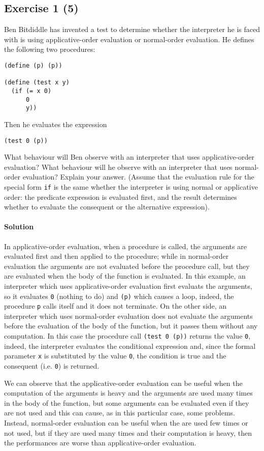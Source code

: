 \subsection*{Exercise 1 (5)}
Ben Bitdiddle has invented a test to determine whether the interpreter he is faced with is using applicative-order evaluation 
or normal-order evaluation. He defines the following two procedures:

\begin{lstlisting}
(define (p) (p))

(define (test x y)
  (if (= x 0)
      0
      y))
\end{lstlisting}

Then he evaluates the expression

\begin{lstlisting}
(test 0 (p))
\end{lstlisting}

What behaviour will Ben observe with an interpreter that uses applicative-order evaluation? What behaviour will he
observe with an interpreter that uses normal-order evaluation? Explain your answer. (Assume that the evaluation
rule for the special form \texttt{if} is the same whether the interpreter is using normal or applicative order: the predicate 
expression is evaluated first, and the result determines whether to evaluate the consequent or the alternative expression).

\paragraph{Solution}
In applicative-order evaluation, when a procedure is called, the arguments are evaluated first and then applied to the
procedure; while in normal-order evaluation the arguments are not evaluated before the procedure call, but they are evaluated
when the body of the function is evaluated.
In this example, an interpreter which uses applicative-order evaluation first evaluats the arguments, so it evaluates \texttt{0} 
(nothing to do) and \texttt{(p)} which causes a loop, indeed, the procedure \texttt{p} calls itself and it does not terminate.
On the other side, an interpreter which uses normal-order evaluation does not evaluate the arguments before the evaluation of
the body of the function, but it passes them without any computation. In this case the procedure call \texttt{(test 0 (p))}
returns the value \texttt{0}, indeed, the interpreter evaluates the conditional expression and, since the formal parameter \texttt{x}
is substituted by the value \texttt{0}, the condition is true and the consequent (i.e. \texttt{0}) is returned.

We can observe that the applicative-order evaluation can be useful when the computation of the arguments is heavy and the arguments are
used many times in the body of the function, but some arguments can be evaluated even if they are not used and this can cause,
as in this particular case, some problems.
Instead, normal-order evaluation can be useful when the are used few times or not used, but if they are used many times and their
computation is heavy, then the performances are worse than applicative-order evaluation.